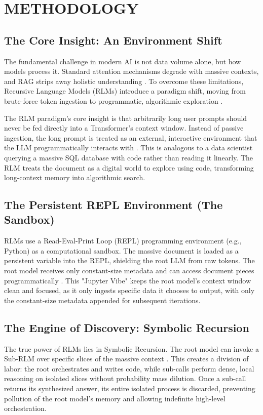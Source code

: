 \chapter{METHODOLOGY}


\section{The Core Insight: An Environment Shift}
The fundamental challenge in modern AI is not data volume alone, but how models process it. Standard attention mechanisms degrade with massive contexts, and RAG strips away holistic understanding \cite{vaswani2017, lewis2020}. To overcome these limitations, Recursive Language Models (RLMs) introduce a paradigm shift, moving from brute-force token ingestion to programmatic, algorithmic exploration \cite{zhang2025}.

The RLM paradigm's core insight is that arbitrarily long user prompts should never be fed directly into a Transformer's context window. Instead of passive ingestion, the long prompt is treated as an external, interactive environment that the LLM programmatically interacts with \cite{zhang2025}. This is analogous to a data scientist querying a massive SQL database with code rather than reading it linearly. The RLM treats the document as a digital world to explore using code, transforming long-context memory into algorithmic search.



\section{The Persistent REPL Environment (The Sandbox)}
RLMs use a Read-Eval-Print Loop (REPL) programming environment (e.g., Python) as a computational sandbox. The massive document is loaded as a persistent variable into the REPL, shielding the root LLM from raw tokens. The root model receives only constant-size metadata and can access document pieces programmatically \cite{zhang2025}. This "Jupyter Vibe" keeps the root model's context window clean and focused, as it only ingests specific data it chooses to output, with only the constant-size metadata appended for subsequent iterations.



\section{The Engine of Discovery: Symbolic Recursion}
The true power of RLMs lies in Symbolic Recursion. The root model can invoke a Sub-RLM over specific slices of the massive context \cite{zhang2025}. This creates a division of labor: the root orchestrates and writes code, while sub-calls perform dense, local reasoning on isolated slices without probability mass dilution. Once a sub-call returns its synthesized answer, its entire isolated process is discarded, preventing pollution of the root model's memory and allowing indefinite high-level orchestration.


